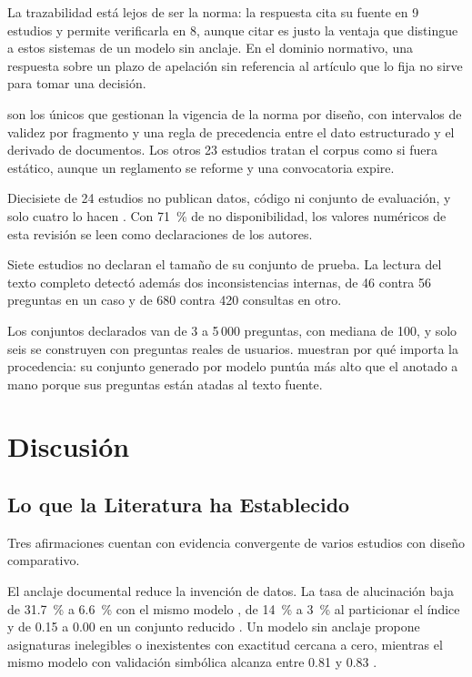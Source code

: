 \documentclass[man,12pt,floatsintext,donotrepeattitle]{apa7}
\begin{document}
La trazabilidad está lejos de ser la norma: la respuesta cita su fuente en 9 estudios y permite verificarla en 8, aunque citar es justo la ventaja que distingue a estos sistemas de un modelo sin anclaje. En el dominio normativo, una respuesta sobre un plazo de apelación sin referencia al artículo que lo fija no sirve para tomar una decisión.

\textcite{stepanov2026} son los únicos que gestionan la vigencia de la norma por diseño, con intervalos de validez por fragmento y una regla de precedencia entre el dato estructurado y el derivado de documentos. Los otros 23 estudios tratan el corpus como si fuera estático, aunque un reglamento se reforme y una convocatoria expire.

Diecisiete de 24 estudios no publican datos, código ni conjunto de evaluación, y solo cuatro lo hacen \parencite{dayata2024,joldea2025,quincoso2026,wojtasik2025}. Con 71~\% de no disponibilidad, los valores numéricos de esta revisión se leen como declaraciones de los autores.

Siete estudios no declaran el tamaño de su conjunto de prueba. La lectura del texto completo detectó además dos inconsistencias internas, de 46 contra 56 preguntas en un caso y de 680 contra 420 consultas en otro.

Los conjuntos declarados van de 3 a 5\,000 preguntas, con mediana de 100, y solo seis se construyen con preguntas reales de usuarios. \textcite{khasanova2025} muestran por qué importa la procedencia: su conjunto generado por modelo puntúa más alto que el anotado a mano porque sus preguntas están atadas al texto fuente.

\section{Discusión}
\subsection{Lo que la Literatura ha Establecido}
Tres afirmaciones cuentan con evidencia convergente de varios estudios con diseño comparativo.

El anclaje documental reduce la invención de datos. La tasa de alucinación baja de 31.7~\% a 6.6~\% con el mismo modelo \parencite{shaikh2025}, de 14~\% a 3~\% al particionar el índice \parencite{vurukonda2026} y de 0.15 a 0.00 en un conjunto reducido \parencite{ekene2025}. Un modelo sin anclaje propone asignaturas inelegibles o inexistentes con exactitud cercana a cero, mientras el mismo modelo con validación simbólica alcanza entre 0.81 y 0.83 \parencite{quincoso2026}.
\end{document}
